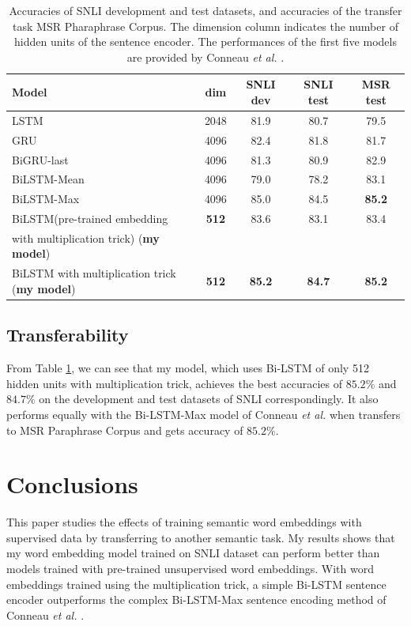 \documentclass{article}
\newcommand{\etal}{\emph{et al. }}
\begin{document}
\begin{table}[t]
\centering
\begin{center}
\begin{tabular}{|l|c|c|c|c|}\hline
Model		& dim	& SNLI dev	& SNLI test	& MSR test \\\hline
LSTM		& 2048	& 81.9	& 80.7	& 79.5 \\\hline
GRU			& 4096	& 82.4	& 81.8	& 81.7 \\\hline
BiGRU-last	& 4096	& 81.3	& 80.9	& 82.9 \\\hline
BiLSTM-Mean	& 4096	& 79.0	& 78.2	& 83.1 \\\hline
BiLSTM-Max	& 4096	& 85.0	& 84.5	& \textbf{85.2} \\\hline
BiLSTM(pre-trained embedding	& \textbf{512}	& 83.6	& 83.1	& 83.4 \\
with multiplication trick) (\textbf{my model})&&&&\\\hline
BiLSTM with multiplication trick (\textbf{my model})	& \textbf{512}	& \textbf{85.2}	& \textbf{84.7}	& \textbf{85.2} \\\hline
\end{tabular}
\end{center}
\caption{Accuracies of SNLI development and test datasets, and accuracies of the transfer task MSR Pharaphrase Corpus. The dimension column indicates the number of hidden units of the sentence encoder. The performances of the first five models are provided by Conneau \etal \cite{conneau2017supervised}.}
\label{tab:acc}
\end{table}

\subsection{Transferability}
From Table \ref{tab:acc}, we can see that my model, which uses Bi-LSTM of only 512 hidden units with multiplication trick, achieves the best accuracies of $85.2\%$ and $84.7\%$ on the development and test datasets of SNLI correspondingly. It also performs equally with the Bi-LSTM-Max model of Conneau \etal when transfers to MSR Paraphrase Corpus and gets accuracy of $85.2\%$.

\section{Conclusions}
This paper studies the effects of training semantic word embeddings with supervised data by transferring to another semantic task. My results shows that my word embedding model trained on SNLI dataset can perform better than models trained with pre-trained unsupervised word embeddings. With word embeddings trained using the multiplication trick, a simple Bi-LSTM sentence encoder outperforms the complex Bi-LSTM-Max sentence encoding method of Conneau \etal.
\end{document}
